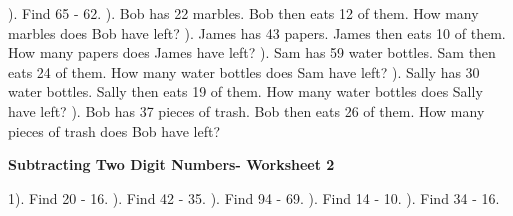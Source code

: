 \documentclass{article}%
\begin{document}
). Find 65 {-} 62.%
\newline%
\newline%
). Bob has 22 marbles. Bob then eats 12 of them. How many marbles does Bob have left?%
\newline%
\newline%
). James has 43 papers. James then eats 10 of them. How many papers does James have left?%
\newline%
\newline%
). Sam has 59 water bottles. Sam then eats 24 of them. How many water bottles does Sam have left?%
\newline%
\newline%
). Sally has 30 water bottles. Sally then eats 19 of them. How many water bottles does Sally have left?%
\newline%
\newline%
). Bob has 37 pieces of trash. Bob then eats 26 of them. How many pieces of trash does Bob have left?%
\newline%
\newline%
\newline%
\pagebreak%
\large%
\begin{center}%
\textbf{Subtracting Two Digit Numbers- Worksheet 2}%
\newline%
\newline%
\newline%
\end{center} \normalsize%
1). Find 20 {-} 16.%
\newline%
\newline%
). Find 42 {-} 35.%
\newline%
\newline%
). Find 94 {-} 69.%
\newline%
\newline%
). Find 14 {-} 10.%
\newline%
\newline%
). Find 34 {-} 16.%
\newline%
\newline%
\end{document}
